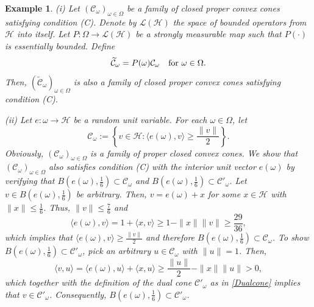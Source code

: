 \documentclass[pdflatex,sn-mathphys-num]{sn-jnl}%
\theoremstyle{thmstyleone}%
\theoremstyle{thmstyletwo}%
\newtheorem{example}{Example}%
\theoremstyle{thmstylethree}%
\newcommand{\cH}{\mathcal{H}}
\newcommand{\cC}{\mathcal{C}}
\newcommand{\cL}{\mathcal{L}}
\numberwithin{equation}{section}
\begin{document}
\begin{example}\label{ConeExample}
(i) Let $(\cC_{\omega})_{\omega\in\Omega}$ be a family of closed proper convex cones satisfying condition (C).  Denote by $\cL(\cH)$ the space of bounded operators from $\cH$ into itself. Let $P:\Omega\rightarrow \cL(\cH)$ be a strongly measurable map such that $P(\cdot)$ is essentially bounded. Define 
\[
\widetilde{\cC}_{\omega}=P(\omega)\cC_{\omega}\quad \hbox{for } \omega\in\Omega.
\]
Then, $(\widetilde{\cC}_{\omega})_{\omega\in\Omega}$ is also a family of closed proper convex cones satisfying condition (C).

\noindent
(ii) Let $e:\omega\rightarrow \cH$ be a random unit variable. For each $\omega\in\Omega$, let 
\begin{equation}\label{Randomcone_Example}
\cC_{\omega}:=\left\{v\in \cH:\langle e(\omega),v\rangle \geq\frac{\|v\|}{2}\right\}.
\end{equation}
Obviously,  $(\cC_{\omega})_{\omega\in\Omega}$ is a family of proper closed convex cones. We show that $(\cC_{\omega})_{\omega\in\Omega}$ also satisfies condition (C) with the interior unit vector $e(\omega)$ by verifying that $B(e(\omega),\frac{1}{6})\subset \cC_{\omega}$ and $B(e(\omega),\frac{1}{6})\subset \cC'_{\omega}$. Let $v\in B(e(\omega),\frac{1}{6})$ be arbitrary. Then, $v=e(\omega)+x$ for some $x\in \cH$ with $\|x\|\leq \frac{1}{6}$. Thus, $\|v\|\leq \frac{7}{6}$ and 
\[
\langle e(\omega),v\rangle=1+ \langle x,v\rangle\geq 1-\|x\|\|v\|\geq \frac{29}{36},
\]
which implies that $\langle e(\omega),v\rangle \geq\frac{\|v\|}{2}$ and therefore $B(e(\omega),\frac{1}{6})\subset \cC_{\omega}$. To show  $B(e(\omega),\frac{1}{6})\subset \cC'_{\omega}$, pick an arbitrary $u\in \cC_{\omega}$ with $\|u\|=1$. Then, 
\[
\langle v,u\rangle=\langle e(\omega),u\rangle+ \langle x,u\rangle 
\geq \frac{\|u\|}{2}-\|x\|\|u\|>0,
\]
which together with the definition of the dual cone $\cC'_{\omega}$ as in \eqref{Dualcone} implies that $v\in \cC'_{\omega}$. Consequently, $B(e(\omega),\frac{1}{6})\subset \cC'_{\omega}$.



\end{example}
\end{document}
